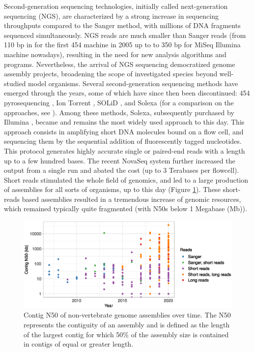 Second-generation sequencing technologies, initially called next-generation sequencing (NGS), are characterized by a strong increase in sequencing throughputs compared to the Sanger method, with millions of DNA fragments sequenced simultaneously. NGS reads are much smaller than Sanger reads (from 110 bp in for the first 454 machine in 2005 up to to 350 bp for MiSeq Illumina machine nowadays), resulting in the need for new analysis algorithms and programs\cite{pop2008}. Nevertheless, the arrival of NGS sequencing democratized genome assembly projects, broadening the scope of investigated species beyond well-studied model organisms. Several second-generation sequencing methods have emerged through the years, some of which have since then been discontinued: 454 pyrosequencing \cite{pyrosequencing}, Ion Torrent \cite{iontorrent}, SOLiD \cite{solid}, and Solexa (for a comparison on the approaches, see \cite{metzker2010}). Among these methods, Solexa, subsequently purchased by Illumina \cite{illumina}, became and remains the most widely used approach to this day. This approach consists in amplifying short DNA molecules bound on a flow cell, and sequencing them by the sequential addition of fluorescently tagged nucleotides. This protocol generates highly accurate single or paired-end reads with a length up to a few hundred bases. The recent NovaSeq system further increased the output from a single run and abated the cost (up to 3 Terabases per flowcell). Short reads stimulated the whole field of genomics, and led to a large production of assemblies for all sorts of organisms, up to this day (Figure \ref{fig:contig_N50_year}). These short-reads based assemblies resulted in a tremendous increase of genomic resources, which remained typically quite fragmented (with N50s below 1 Megabase (Mb)). \\

\begin{figure}[H]
    \centering
    \includegraphics[width=\textwidth]{fig/review_contig_N50_year.eps}
    \caption{Contig N50 of non-vertebrate genome assemblies over time. The N50 represents the contiguity of an assembly and is defined as the length of the largest contig for which 50\% of the assembly size is contained in contigs of equal or greater length.}
    \label{fig:contig_N50_year}
\end{figure}

